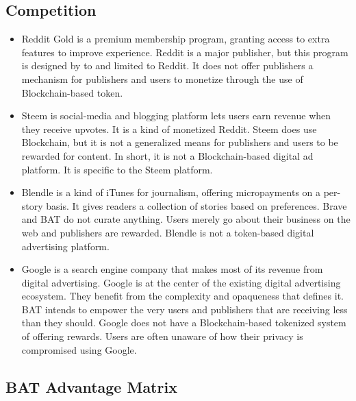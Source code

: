 \documentclass[11pt]{article}
\begin{document}
\subsection{Competition}
\label{sec-5-1}
\begin{itemize}
\item{Reddit Gold is a premium membership program, granting access to extra features to improve experience. Reddit is a major publisher, but this program is designed by to and limited to Reddit. It does not offer publishers a mechanism for publishers and users to monetize through the use of Blockchain-based token.}
\item{Steem is social-media and blogging platform lets users earn revenue when they receive upvotes. It is a kind of monetized Reddit. Steem does use Blockchain, but it is not a generalized means for publishers and users to be rewarded for content. In short, it is not a Blockchain-based digital ad platform. It is specific to the Steem platform. }
\item{Blendle is a kind of iTunes for journalism, offering micropayments on a per-story basis. It gives readers a collection of stories based on preferences. Brave and BAT do not curate anything. Users merely go about their business on the web and publishers are rewarded. Blendle is not a token-based digital advertising platform. }
\item{Google is a search engine company that makes most of its revenue from digital advertising. Google is at the center of the existing digital advertising ecosystem. They benefit from the complexity and opaqueness that defines it. BAT intends to empower the very users and publishers that are receiving less than they should. Google does not have a Blockchain-based tokenized system of offering rewards. Users are often unaware of how their privacy is compromised using Google.}
\end{itemize}

\subsection{BAT Advantage Matrix}
\label{sec-5-2}
\end{document}
